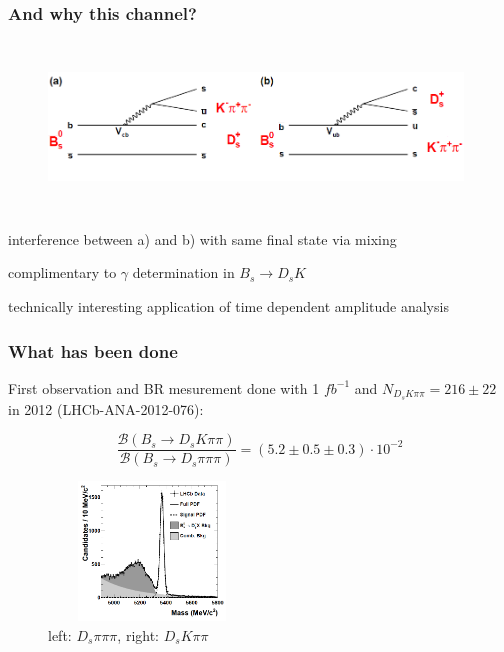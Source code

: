 \documentclass[]{beamer}
\begin{document}
\begin{frame}
\frametitle{And why this channel?}

\begin{figure}
\includegraphics[width=11.0cm,height=4.5cm]{pics/FeynmannGraphs}
\end{figure}

interference between a) and b) with same final state via mixing \newline

complimentary to $\gamma$ determination in $B_{s}\rightarrow D_{s}K$ \newline

technically interesting application of time dependent amplitude analysis 

\end{frame}


\begin{frame}
\frametitle{What has been done}

First observation and BR mesurement done with 1 $fb^{-1}$ and $N_{D_{s}K\pi\pi} = 216 \pm 22$ in 2012 (LHCb-ANA-2012-076): 

\[\frac{\mathcal{B}(B_{s}\rightarrow D_{s}K\pi\pi)}{\mathcal{B}(B_{s}\rightarrow D_{s}\pi\pi\pi)} = (5.2\pm 0.5 \pm 0.3) \cdot 10^{-2}\]
 

\begin{figure}
\includegraphics[width=5.5cm,height=3.7cm]{pics/BsDspipipi}
\caption{left: $D_{s}\pi\pi\pi$, right: $D_{s}K\pi\pi$}
\end{figure}


\end{frame}
\end{document}
